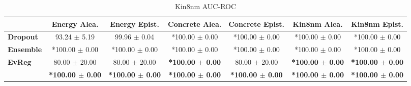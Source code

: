 \begin{table*}[ht]
    \caption{Kin8nm AUC-ROC}
    \centering
    \scriptsize
    \begin{tabular}{lcccccc}
        \toprule
        & \textbf{Energy Alea.} & \textbf{Energy Epist.} & \textbf{Concrete Alea.} & \textbf{Concrete Epist.} & \textbf{Kin8nm Alea.} & \textbf{Kin8nm Epist.} \\
        \midrule
        \textbf{Dropout} & 93.24 $\pm$ 5.19 & 99.96 $\pm$ 0.04 & *100.00 $\pm$ 0.00 & *100.00 $\pm$ 0.00 & *100.00 $\pm$ 0.00 & *100.00 $\pm$ 0.00 \\
        \textbf{Ensemble} & *100.00 $\pm$ 0.00 & *100.00 $\pm$ 0.00 & *100.00 $\pm$ 0.00 & *100.00 $\pm$ 0.00 & *100.00 $\pm$ 0.00 & *100.00 $\pm$ 0.00 \\
        \midrule
        \textbf{EvReg} & 80.00 $\pm$ 20.00 & 80.00 $\pm$ 20.00 & \textbf{*100.00 $\pm$ 0.00} & 80.00 $\pm$ 20.00 & \textbf{*100.00 $\pm$ 0.00} & \textbf{*100.00 $\pm$ 0.00} \\
        \textbf{\oursacro{}} & \textbf{*100.00 $\pm$ 0.00} & \textbf{*100.00 $\pm$ 0.00} & \textbf{*100.00 $\pm$ 0.00} & \textbf{*100.00 $\pm$ 0.00} & \textbf{*100.00 $\pm$ 0.00} & \textbf{*100.00 $\pm$ 0.00} \\
        \bottomrule
    \end{tabular}
\end{table*}